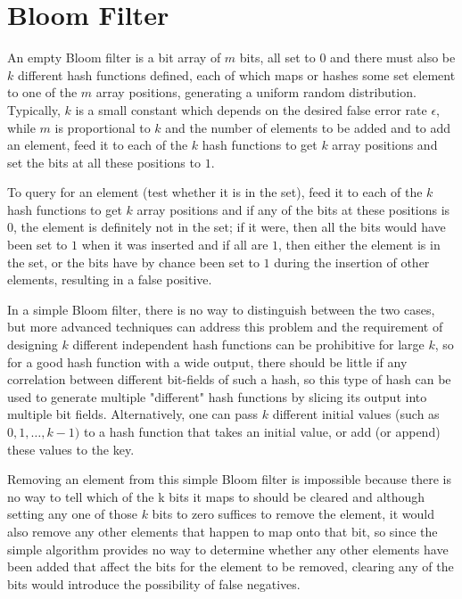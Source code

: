 \section{Bloom Filter}
An empty Bloom filter is a bit array of $m$ bits, all set to $0$ and there must also be $k$ different hash functions defined, each of which maps or hashes some set element to one of the
$m$ array positions, generating a uniform random distribution.\newline
Typically, $k$ is a small constant which depends on the desired false error rate $\epsilon$, while $m$ is proportional to $k$ and the number of elements to be added and 
to add an element, feed it to each of the $k$ hash functions to get $k$ array positions and set the bits at all these positions to $1$.

To query for an element (test whether it is in the set), feed it to each of the $k$ hash functions to get $k$ array positions and if any of the bits at these positions is $0$,
the element is definitely not in the set; if it were, then all the bits would have been set to $1$ when it was inserted and if all are $1$, then either the element is in the set,
or the bits have by chance been set to $1$ during the insertion of other elements, resulting in a false positive.

In a simple Bloom filter, there is no way to distinguish between the two cases, but more advanced techniques can address this problem and 
the requirement of designing $k$ different independent hash functions can be prohibitive for large $k$, so for a good hash function with a wide output,
there should be little if any correlation between different bit-fields of such a hash, so this type of hash can be used to generate multiple "different" hash functions
by slicing its output into multiple bit fields.\newline
Alternatively, one can pass $k$ different initial values (such as $0, 1, \dots, k-1)$ to a hash function that takes an initial value, or add (or append) these values to the key. 

Removing an element from this simple Bloom filter is impossible because there is no way to tell which of the k bits it maps to should be cleared and although setting any one of those
$k$ bits to zero suffices to remove the element, it would also remove any other elements that happen to map onto that bit, so since the simple algorithm provides no way
to determine whether any other elements have been added that affect the bits for the element to be removed, clearing any of the bits would introduce the possibility of false negatives.

